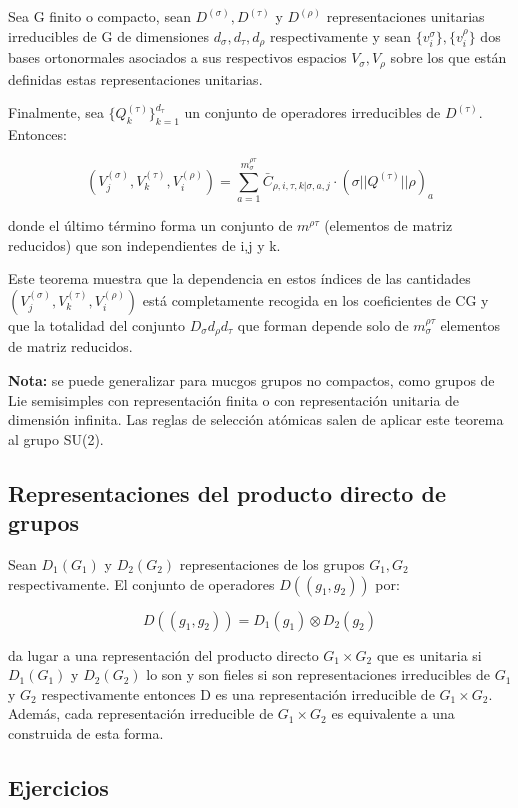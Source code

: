 \documentclass{article}
\begin{document}
\smallskip
Sea G finito o compacto, sean $D^{(\sigma)}, D^{(\tau)}$ y $D^{(\rho)}$ representaciones unitarias irreducibles de G de dimensiones $d_\sigma,d_\tau, d_\rho$ respectivamente y sean $\lbrace v_i^{\sigma}\rbrace, \lbrace v_i^{\rho}\rbrace $ dos bases ortonormales asociados a sus respectivos espacios $V_\sigma, V_\rho$ sobre los que están definidas estas representaciones unitarias.

Finalmente, sea $\lbrace Q_k^{(\tau)} \rbrace _{k=1}^{d_\tau}$ un conjunto de operadores irreducibles de $D^{(\tau)}$. Entonces:

$$(V_j^{(\sigma)}, V_k^{(\tau)}, V_i^{(\rho)})=\sum _{a=1}^{m_\sigma ^{\rho \tau}} \bar{C}_{\rho, i, \tau ,k | \sigma , a, j}\cdot (\sigma || Q^{(\tau)}||\rho)_a$$

donde el último término forma un conjunto de $m^{\rho \tau}$ (elementos de matriz reducidos) que son independientes de i,j y k.

Este teorema muestra que la dependencia en estos índices de las cantidades $(V_j^{(\sigma)}, V_k^{(\tau)}, V_i^{(\rho)})$ está completamente recogida en los coeficientes de CG y que la totalidad del conjunto $D_\sigma d_\rho d_\tau$ que forman depende solo de $m^{\rho \tau}_\sigma$ elementos de matriz reducidos.

\smallskip
\textbf{Nota:} se puede generalizar para mucgos grupos no compactos, como grupos de Lie semisimples con representación finita o con representación unitaria de dimensión infinita.
Las reglas de selección atómicas salen de aplicar este teorema al grupo SU(2).

\subsection{Representaciones del producto directo de grupos}

Sean $D_1(G_1)$ y $D_2 (G_2)$ representaciones de los grupos $G_1, G_2$ respectivamente. El conjunto de operadores $D((g_1,g_2))$ por:

$$D((g_1,g_2))=D_1(g_1)\otimes D_2(g_2)$$

da lugar a una representación del producto directo $G_1\times G_2$ que es unitaria si $D_1(G_1)$ y $D_2(G_2)$ lo son y son fieles si son representaciones irreducibles de $G_1$ y $G_2$ respectivamente entonces D es una representación irreducible de $G_1 \times G_2$. Además, cada representación irreducible de $G_1 \times G_2$ es equivalente a una construida de esta forma.

\newpage
\subsection{Ejercicios}
\end{document}
